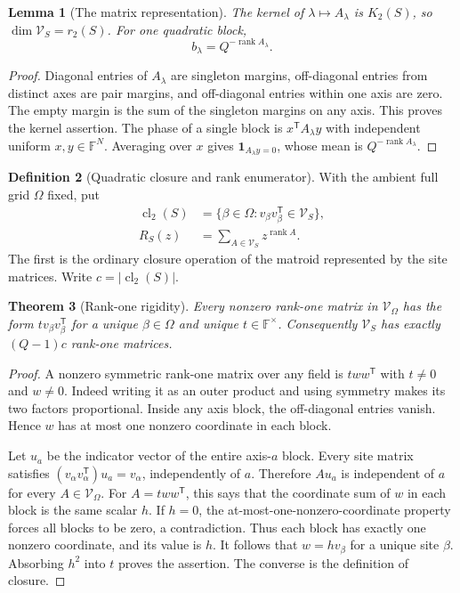 \documentclass[11pt,a4paper]{article}
\numberwithin{equation}{section}
\newtheorem{theorem}{Theorem}[section]
\newtheorem{lemma}[theorem]{Lemma}
\theoremstyle{definition}
\newtheorem{definition}[theorem]{Definition}
\theoremstyle{remark}
\newcommand{\F}{\mathbb F}
\newcommand{\1}{\mathbf 1}
\newcommand{\rank}{\operatorname{rank}}
\newcommand{\cl}{\operatorname{cl}}
\begin{document}
\begin{lemma}[The matrix representation]\label{gm:lem:matrix-representation}
The kernel of $\lambda\mapsto A_\lambda$ is $K_2(S)$, so
$\dim\mathcal V_S=r_2(S)$. For one quadratic block,
\begin{equation}\label{gm:eq:rank-bias}
 b_\lambda=Q^{-\rank A_\lambda}.
\end{equation}
\end{lemma}

\begin{proof}
Diagonal entries of $A_\lambda$ are singleton margins, off-diagonal
entries from distinct axes are pair margins, and off-diagonal entries
within one axis are zero. The empty margin is the sum of the singleton
margins on any axis. This proves the kernel assertion. The phase of a
single block is $x^{\mathsf T}A_\lambda y$ with independent uniform
$x,y\in\F^N$. Averaging over $x$ gives $\1_{A_\lambda y=0}$, whose mean
is $Q^{-\rank A_\lambda}$.
\end{proof}

\begin{definition}[Quadratic closure and rank enumerator]
With the ambient full grid $\Omega$ fixed, put
\begin{align}
 \cl_2(S)&=\{\beta\in\Omega:v_\beta v_\beta^{\mathsf T}\in\mathcal V_S\},
                 \label{gm:eq:closure-definition}\\
 R_S(z)&=\sum_{A\in\mathcal V_S}z^{\rank A}.
                 \label{gm:eq:rank-enumerator}
\end{align}
The first is the ordinary closure operation of the matroid represented by
the site matrices. Write $c=|\cl_2(S)|$.
\end{definition}

\begin{theorem}[Rank-one rigidity]\label{gm:thm:rank-one}
Every nonzero rank-one matrix in $\mathcal V_\Omega$ has the form
$t v_\beta v_\beta^{\mathsf T}$ for a unique $\beta\in\Omega$ and unique
$t\in\F^\times$. Consequently $\mathcal V_S$ has exactly $(Q-1)c$
rank-one matrices.
\end{theorem}

\begin{proof}
A nonzero symmetric rank-one matrix over any field is $tww^{\mathsf T}$
with $t\ne0$ and $w\ne0$. Indeed writing it as an outer product and using
symmetry makes its two factors proportional. Inside any axis block, the
off-diagonal entries vanish. Hence $w$ has at most one nonzero coordinate
in each block.

Let $u_a$ be the indicator vector of the entire axis-$a$ block. Every
site matrix satisfies
$(v_\alpha v_\alpha^{\mathsf T})u_a=v_\alpha$, independently of $a$.
Therefore $A u_a$ is independent of $a$ for every $A\in\mathcal V_\Omega$.
For $A=tww^{\mathsf T}$, this says that the coordinate sum of $w$ in each
block is the same scalar $h$. If $h=0$, the at-most-one-nonzero-coordinate
property forces all blocks to be zero, a contradiction. Thus each block
has exactly one nonzero coordinate, and its value is $h$. It follows that
$w=h v_\beta$ for a unique site $\beta$. Absorbing $h^2$ into $t$ proves
the assertion. The converse is the definition of closure.
\end{proof}
\end{document}
